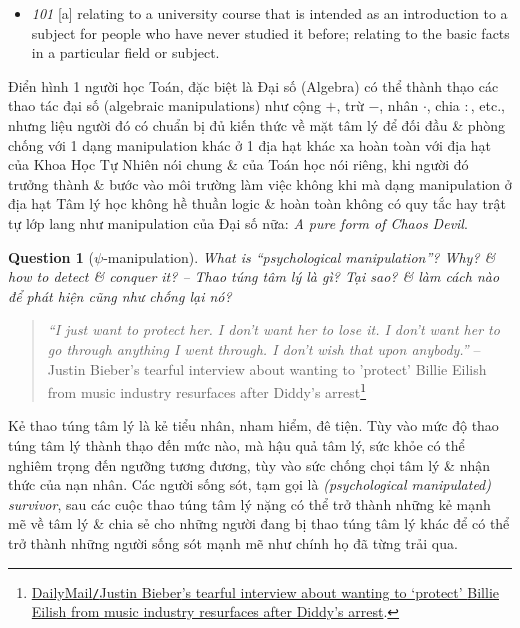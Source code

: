 \documentclass[12pt,twoside]{book}
\newtheorem{question}{Question}
\begin{document}
\begin{itemize}\small\sf
	\item {\it101} [a] relating to a university course that is intended as an introduction to a subject for people who have never studied it before; relating to the basic facts in a particular field or subject.
\end{itemize}
Điển hình 1 người học Toán, đặc biệt là Đại số (Algebra) có thể thành thạo các thao tác đại số (algebraic manipulations) như cộng $+$, trừ $-$, nhân $\cdot$, chia $:$, etc., nhưng liệu người đó có chuẩn bị đủ kiến thức về mặt tâm lý để đối đầu \& phòng chống với 1 dạng manipulation khác ở 1 địa hạt khác xa hoàn toàn với địa hạt của Khoa Học Tự Nhiên nói chung \& của Toán học nói riêng, khi người đó trưởng thành \& bước vào môi trường làm việc không khi mà dạng manipulation ở địa hạt Tâm lý học không hề thuần logic \& hoàn toàn không có quy tắc hay trật tự lớp lang như manipulation của Đại số nữa: {\it A pure form of Chaos Devil}.

\begin{question}[$\psi$-manipulation]
	What is ``psychological manipulation''? Why? \& how to detect \& conquer it? -- Thao túng tâm lý là gì? Tại sao? \& làm cách nào để phát hiện cũng như chống lại nó?
\end{question}

\begin{quotation}
	{\it``I just want to protect her. I don't want her to lose it. I don't want her to go through anything I went through. I don't wish that upon anybody.''} -- {\sc Justin Bieber}'s tearful interview about wanting to 'protect' {\sc Billie Eilish} from music industry resurfaces after Diddy's arrest\footnote{\href{https://www.dailymail.co.uk/news/article-13885907/justin-bieber-tearful-interview-resurface-billie-eilish-diddy-arrest.html}{DailyMail{\tt/}{\sc Justin Bieber}'s tearful interview about wanting to `protect' {\sc Billie Eilish} from music industry resurfaces after Diddy's arrest}.}
\end{quotation}
Kẻ thao túng tâm lý là kẻ tiểu nhân, nham hiểm, đê tiện. Tùy vào mức độ thao túng tâm lý thành thạo đến mức nào, mà hậu quả tâm lý, sức khỏe có thể nghiêm trọng đến ngưỡng tương đương, tùy vào sức chống chọi tâm lý \& nhận thức của nạn nhân. Các người sống sót, tạm gọi là {\it (psychological manipulated) survivor}, sau các cuộc thao túng tâm lý nặng có thể trở thành những kẻ mạnh mẽ về tâm lý \& chia sẻ cho những người đang bị thao túng tâm lý khác để có thể trở thành những người sống sót mạnh mẽ như chính họ đã từng trải qua.
\end{document}
